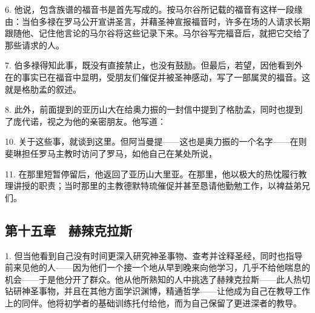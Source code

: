 6. 他说，包含族谱的福音书是首先写成的。按马尔谷所记载的福音有这样一段缘由：当伯多禄在罗马公开宣讲圣言，并藉圣神宣报福音时，许多在场的人请求长期跟随他、记住他言论的马尔谷将这些记录下来。马尔谷写完福音后，就把它交给了那些请求的人。\par

7. 伯多禄得知此事，既没有直接禁止，也没有鼓励。但最后，若望，因他看到外在的事实已在福音中显明，受朋友们催促并被圣神感动，写了一部属灵的福音。这就是格肋孟的叙述。\par

8. 此外，前面提到的亚历山大在给奥力振的一封信中提到了格肋孟，同时也提到了庞代诺，视之为他的亲密朋友。他写道：\par

\par

\par

10. 关于这些事，就谈到这里。但阿当曼提——这也是奥力振的一个名字——在则斐琳担任罗马主教时访问了罗马，如他自己在某处所说，\par

11. 在那里短暂停留后，他返回了亚历山大里亚。在那里，他以极大的热忱履行教理讲授的职责；当时那里的主教德默特琉催促并甚至恳请他勤勉工作，以裨益弟兄们。\par


\subsection{第十五章　赫辣克拉斯}

1. 但当他看到自己没有时间更深入研究神圣事物、查考并诠释圣经，同时也指导前来见他的人——因为他们一个接一个地从早到晚来向他学习，几乎不给他喘息的机会——于是他分开了群众。他从他所熟知的人中挑选了赫辣克拉斯——此人热切钻研神圣事物，并且在其他方面学识渊博，精通哲学——让他成为自己在教导工作上的同伴。他将初学者的基础训练托付给他，而为自己保留了更进深者的教导。\par


